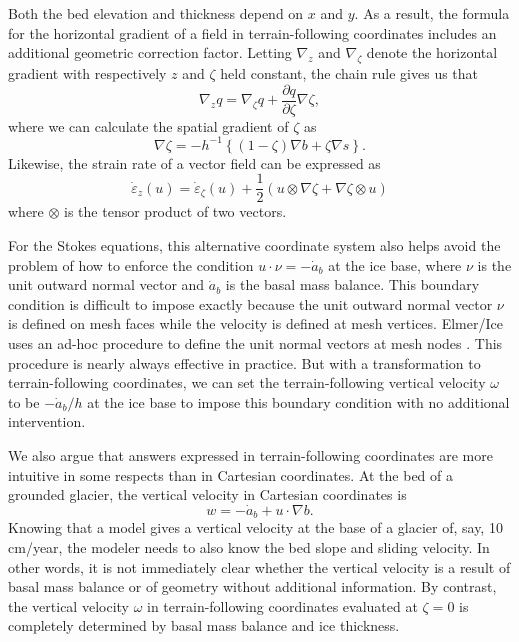 \documentclass{article}
\theoremstyle{definition}
\theoremstyle{plain}
\begin{document}
Both the bed elevation and thickness depend on $x$ and $y$.
As a result, the formula for the horizontal gradient of a field in terrain-following coordinates includes an additional geometric correction factor.
Letting $\nabla_z$ and $\nabla_\zeta$ denote the horizontal gradient with respectively $z$ and $\zeta$ held constant, the chain rule gives us that
\begin{equation}
    \nabla_zq = \nabla_\zeta q + \frac{\partial q}{\partial\zeta}\nabla\zeta,
\end{equation}
where we can calculate the spatial gradient of $\zeta$ as
\begin{equation}
    \nabla\zeta = -h^{-1}\left\{(1 - \zeta)\nabla b + \zeta\nabla s\right\}.
\end{equation}
Likewise, the strain rate of a vector field can be expressed as
\begin{equation}
    \dot\varepsilon_z(u) = \dot\varepsilon_\zeta(u) + \frac{1}{2}\left(u \otimes\nabla\zeta + \nabla\zeta\otimes u\right)
    \label{eq:geometric-correction}
\end{equation}
where $\otimes$ is the tensor product of two vectors.

For the Stokes equations, this alternative coordinate system also helps avoid the problem of how to enforce the condition $u\cdot \nu = -\dot a_b$ at the ice base, where $\nu$ is the unit outward normal vector and $\dot a_b$ is the basal mass balance.
This boundary condition is difficult to impose exactly because the unit outward normal vector $\nu$ is defined on mesh faces while the velocity is defined at mesh vertices.
Elmer/Ice uses an ad-hoc procedure to define the unit normal vectors at mesh nodes \citep{gagliardini2013capabilities}.
This procedure is nearly always effective in practice.
But with a transformation to terrain-following coordinates, we can set the terrain-following vertical velocity $\omega$ to be $-\dot a_b/h$ at the ice base to impose this boundary condition with no additional intervention.

We also argue that answers expressed in terrain-following coordinates are more intuitive in some respects than in Cartesian coordinates.
At the bed of a grounded glacier, the vertical velocity in Cartesian coordinates is
\begin{equation}
    w = -\dot a_b + u\cdot\nabla b.
\end{equation}
Knowing that a model gives a vertical velocity at the base of a glacier of, say, 10 cm/year, the modeler needs to also know the bed slope and sliding velocity.
In other words, it is not immediately clear whether the vertical velocity is a result of basal mass balance or of geometry without additional information.
By contrast, the vertical velocity $\omega$ in terrain-following coordinates evaluated at $\zeta = 0$ is completely determined by basal mass balance and ice thickness.
\end{document}
